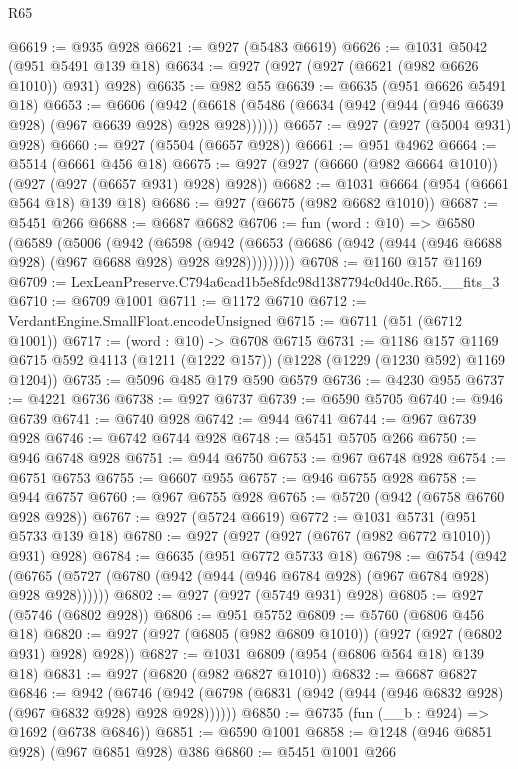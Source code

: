 \begin{lexlean}{R65}
\begin{coremodule}
@6619 := @935 @928
@6621 := @927 (@5483 @6619)
@6626 := @1031 @5042 (@951 @5491 @139 @18)
@6634 := @927 (@927 (@927 (@6621 (@982 @6626 @1010)) @931) @928)
@6635 := @982 @55
@6639 := @6635 (@951 @6626 @5491 @18)
@6653 := @6606
    (@942 (@6618 (@5486 (@6634 (@942 (@944 (@946 @6639 @928) (@967 @6639 @928) @928 @928))))))
@6657 := @927 (@927 (@5004 @931) @928)
@6660 := @927 (@5504 (@6657 @928))
@6661 := @951 @4962
@6664 := @5514 (@6661 @456 @18)
@6675 := @927 (@927 (@6660 (@982 @6664 @1010)) (@927 (@927 (@6657 @931) @928) @928))
@6682 := @1031 @6664 (@954 (@6661 @564 @18) @139 @18)
@6686 := @927 (@6675 (@982 @6682 @1010))
@6687 := @5451 @266
@6688 := @6687 @6682
@6706 := fun (word : @10) =>
  @6580
    (@6589
      (@5006
        (@942
          (@6598
            (@942 (@6653 (@6686 (@942 (@944 (@946 @6688 @928) (@967 @6688 @928) @928 @928)))))))))
@6708 := @1160 @157 @1169
@6709 := LexLeanPreserve.C794a6cad1b5e8fdc98d1387794c0d40c.R65.__fits_3
@6710 := @6709 @1001
@6711 := @1172 @6710
@6712 := VerdantEngine.SmallFloat.encodeUnsigned
@6715 := @6711 (@51 (@6712 @1001))
@6717 := (word : @10) -> @6708 @6715
@6731 := @1186
    @157
    @1169
    @6715
    @592
    @4113
    (@1211 (@1222 @157))
    (@1228 (@1229 (@1230 @592) @1169 @1204))
@6735 := @5096 @485 @179 @590 @6579
@6736 := @4230 @955
@6737 := @4221 @6736
@6738 := @927 @6737
@6739 := @6590 @5705
@6740 := @946 @6739
@6741 := @6740 @928
@6742 := @944 @6741
@6744 := @967 @6739 @928
@6746 := @6742 @6744 @928
@6748 := @5451 @5705 @266
@6750 := @946 @6748 @928
@6751 := @944 @6750
@6753 := @967 @6748 @928
@6754 := @6751 @6753
@6755 := @6607 @955
@6757 := @946 @6755 @928
@6758 := @944 @6757
@6760 := @967 @6755 @928
@6765 := @5720 (@942 (@6758 @6760 @928 @928))
@6767 := @927 (@5724 @6619)
@6772 := @1031 @5731 (@951 @5733 @139 @18)
@6780 := @927 (@927 (@927 (@6767 (@982 @6772 @1010)) @931) @928)
@6784 := @6635 (@951 @6772 @5733 @18)
@6798 := @6754
    (@942 (@6765 (@5727 (@6780 (@942 (@944 (@946 @6784 @928) (@967 @6784 @928) @928 @928))))))
@6802 := @927 (@927 (@5749 @931) @928)
@6805 := @927 (@5746 (@6802 @928))
@6806 := @951 @5752
@6809 := @5760 (@6806 @456 @18)
@6820 := @927 (@927 (@6805 (@982 @6809 @1010)) (@927 (@927 (@6802 @931) @928) @928))
@6827 := @1031 @6809 (@954 (@6806 @564 @18) @139 @18)
@6831 := @927 (@6820 (@982 @6827 @1010))
@6832 := @6687 @6827
@6846 := @942
    (@6746 (@942 (@6798 (@6831 (@942 (@944 (@946 @6832 @928) (@967 @6832 @928) @928 @928))))))
@6850 := @6735 (fun (__b : @924) => @1692 (@6738 @6846))
@6851 := @6590 @1001
@6858 := @1248 (@946 @6851 @928) (@967 @6851 @928) @386
@6860 := @5451 @1001 @266

\end{coremodule}
\end{lexlean}
